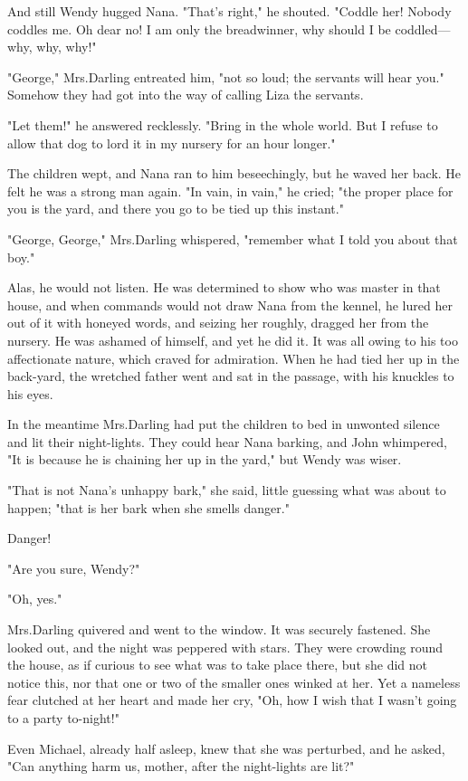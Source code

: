 And still Wendy hugged Nana.
"That's right," he shouted.
"Coddle her!
Nobody coddles me.
Oh dear no!
I am only the breadwinner, why should I be coddled—why, why, why!"

"George," Mrs.\@ Darling entreated him, "not so loud;
the servants will hear you."
Somehow they had got into the way of calling Liza the servants.

"Let them!\@" he answered recklessly.
"Bring in the whole world.
But I refuse to allow that dog to lord it in my nursery for an hour longer."

The children wept, and Nana ran to him beseechingly, but he waved her back.
He felt he was a strong man again.
"In vain, in vain," he cried;
"the proper place for you is the yard, and there you go to be tied up this instant."

"George, George," Mrs.\@ Darling whispered, "remember what I told you about that boy."

Alas, he would not listen.
He was determined to show who was master in that house, and when commands would not draw Nana from the kennel, he lured her out of it with honeyed words, and seizing her roughly, dragged her from the nursery.
He was ashamed of himself, and yet he did it.
It was all owing to his too affectionate nature, which craved for admiration.
When he had tied her up in the back-yard, the wretched father went and sat in the passage, with his knuckles to his eyes.

In the meantime Mrs.\@ Darling had put the children to bed in unwonted silence and lit their night-lights.
They could hear Nana barking, and John whimpered, "It is because he is chaining her up in the yard," but Wendy was wiser.

"That is not Nana's unhappy bark," she said, little guessing what was about to happen;
"that is her bark when she smells danger."

Danger!

"Are you sure, Wendy?"

"Oh, yes."

Mrs.\@ Darling quivered and went to the window.
It was securely fastened.
She looked out, and the night was peppered with stars.
They were crowding round the house, as if curious to see what was to take place there, but she did not notice this, nor that one or two of the smaller ones winked at her.
Yet a nameless fear clutched at her heart and made her cry, "Oh, how I wish that I wasn't going to a party to-night!"

Even Michael, already half asleep, knew that she was perturbed, and he asked, "Can anything harm us, mother, after the night-lights are lit?"


